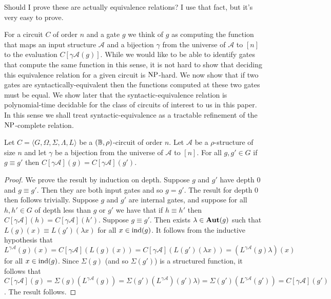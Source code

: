 \documentclass[../paper.tex]{subfiles}
\begin{document}
\begin{drem}
  Should I prove these are actually equivalence relations? I use that fact, but
  it's very easy to prove.
\end{drem}

For a circuit $C$ of order $n$ and a gate $g$ we think of $g$ as computing the
function that maps an input structure $\mathcal{A}$ and a bijection $\gamma$
from the universe of $\mathcal{A}$ to $[n]$ to the evaluation $C[\gamma
\mathcal{A}(g)]$. While we would like to be able to identify gates that compute
the same function in this sense, it is not hard to show that deciding this
equivalence relation for a given circuit is $\mathrm{NP}$-hard. We now show that if two
gates are syntactically-equivalent then the functions computed at these two
gates must be equal. We show later that the syntactic-equivalence relation is
polynomial-time decidable for the class of circuits of interest to us in this
paper. In this sense we shall treat syntactic-equivalence as a tractable
refinement of the $\mathrm{NP}$-complete relation.

\begin{lem}
  Let $C = \langle G, \Omega, \Sigma, \Lambda, L \rangle$ be a $(\mathbb{B},
  \rho)$-circuit of order $n$. Let $\mathcal{A}$ be a $\rho$-structure of size
  $n$ and let $\gamma$ be a bijection from the universe of $\mathcal{A}$ to
  $[n]$. For all $g, g' \in G$ if $g \equiv g'$ then $C[\gamma \mathcal{A}](g) =
  C[\gamma \mathcal{A}](g')$.
  \label{lem:syntactic-equivalence-equal-function}
\end{lem}
\begin{proof}
  We prove the result by induction on depth. Suppose $g$ and $g'$ have depth $0$
  and $g \equiv g'$. Then they are both input gates and so $g = g'$. The result
  for depth $0$ then follows trivially. Suppose $g$ and $g'$ are internal gates,
  and suppose for all $h, h' \in G$ of depth less than $g$ or $g'$ we have that
  if $h \equiv h'$ then $C[\gamma \mathcal{A}](h) = C[\gamma \mathcal{A}](h')$.
  Suppose $g \equiv g'$. Then exists $\lambda \in \text{\textbf{Aut}}(g)$ such that $L(g) (x)
  \equiv L(g') (\lambda x)$ for all $x \in \text{\upshape ind}(g)$. It follows from the
  inductive hypothesis that $L^{\gamma \mathcal{A}}(g)(x) = C[\gamma
  \mathcal{A}](L(g)(x)) = C[\gamma \mathcal{A}](L(g')(\lambda x)) = (L^{\gamma
    \mathcal{A}}(g) \lambda) (x)$ for all $x \in \text{\upshape ind}(g)$. Since $\Sigma(g)$
  (and so $\Sigma(g')$) is a structured function, it follows that $C[\gamma
  \mathcal{A}](g) = \Sigma(g)(L^{\gamma \mathcal{A}} (g)) = \Sigma(g')
  (L^{\gamma \mathcal{A}})(g') \lambda) = \Sigma(g') (L^{\gamma
    \mathcal{A}}(g')) = C[\gamma \mathcal{A}](g')$. The result follows.
\end{proof}
\end{document}
